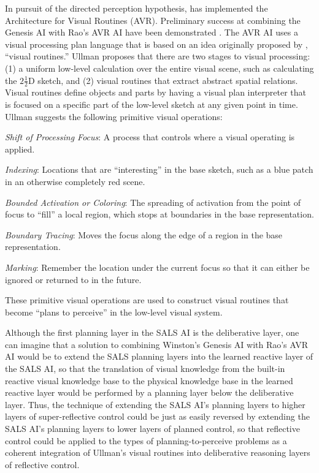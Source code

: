 In pursuit of the directed perception hypothesis, \cite{rao:1998} has
implemented the Architecture for Visual Routines (AVR).  Preliminary
success at combining the Genesis AI with Rao's AVR AI have been
demonstrated \cite[]{winston:2011}.  The AVR AI uses a visual
processing plan language that is based on an idea originally proposed
by \cite{ullman:1984}, ``visual routines.''  Ullman proposes that
there are two stages to visual processing: (1) a uniform low-level
calculation over the entire visual scene, such as calculating the
$2\frac{1}{2}$D sketch, and (2) visual routines that extract abstract
spatial relations.  Visual routines define objects and parts by having
a visual plan interpreter that is focused on a specific part of the
low-level sketch at any given point in time.  Ullman suggests the
following primitive visual operations:
\begin{packed_enumerate}
\item{\emph{Shift of Processing Focus}: A process that controls where
  a visual operating is applied.}
\item{\emph{Indexing}: Locations that are ``interesting'' in the base
  sketch, such as a blue patch in an otherwise completely red scene.}
\item{\emph{Bounded Activation or Coloring}: The spreading of
  activation from the point of focus to ``fill'' a local region, which
  stops at boundaries in the base representation.}
\item{\emph{Boundary Tracing}: Moves the focus along the edge of a
  region in the base representation.}
\item{\emph{Marking}: Remember the location under the current focus so
  that it can either be ignored or returned to in the future.}
\end{packed_enumerate}
These primitive visual operations are used to construct visual
routines that become ``plans to perceive''
\cite[]{pryor:1992,pryorcollins:1995,velez:2011} in the low-level
visual system.

Although the first planning layer in the SALS AI is the deliberative
layer, one can imagine that a solution to combining Winston's Genesis
AI with Rao's AVR AI would be to extend the SALS planning layers into
the learned reactive layer of the SALS AI, so that the translation of
visual knowledge from the built-in reactive visual knowledge base to
the physical knowledge base in the learned reactive layer would be
performed by a planning layer below the deliberative layer.  Thus, the
technique of extending the SALS AI's planning layers to higher layers
of super-reflective control could be just as easily reversed by
extending the SALS AI's planning layers to lower layers of planned
control, so that reflective control could be applied to the types of
planning-to-perceive problems as a coherent integration of Ullman's
visual routines into deliberative reasoning layers of reflective
control.

